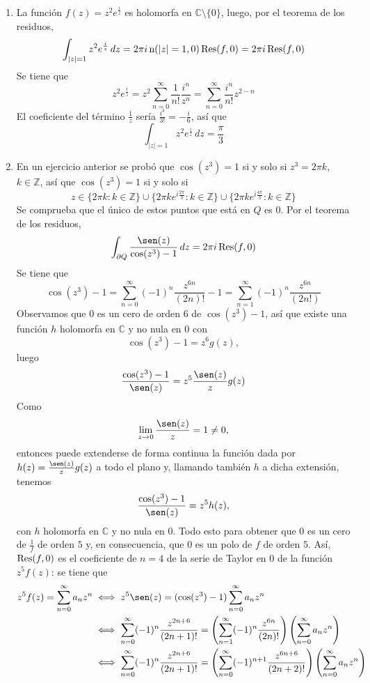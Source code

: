 \documentclass[11pt]{report}
\makeatletter
\renewenvironment{proof}[1][\proofname]{\par
  \pushQED{\qed}%
  \normalfont \topsep\z@skip %
  \trivlist
  \item[\hskip\labelsep
        \itshape
    #1\@addpunct{.}]\ignorespaces
}{%
  \popQED\endtrivlist\@endpefalse
}
\newcommand{\Z}{\mathbb Z}
\newcommand{\C}{\mathbb C}
\makeatother
\begin{document}
\begin{proof}
  \hfill
  \begin{enumerate}
    \item La función $f(z)=z^2e^{\frac{i}{z}}$ es holomorfa en $\C \setminus \{0\}$, luego, por el teorema de los residuos,
    \[\int_{|z|=1}z^2e^{\frac{i}{z}} \, dz = 2\pi i \, \textup{n}(|z|=1, 0) \, \textup{Res}(f,0) = 2\pi i \, \textup{Res}(f,0)\]
    Se tiene que
    \[z^2e^{\frac{i}{z}} = z^2\sum_{n=0}^\infty \frac{1}{n!}\frac{i^n}{z^n} = \sum_{n=0}^\infty \frac{i^n}{n!}z^{2-n}\]
    El coeficiente del término $\frac{1}{z}$ sería $\frac{i^3}{3!} = -\frac{i}{6}$, así que
    \[\int_{|z|=1}z^2e^{\frac{i}{z}} \, dz = \frac{\pi}{3}\]
    \item En un ejercicio anterior se probó que $\cos(z^3) = 1$ si y solo si $z^3 = 2\pi k$, $k \in \Z$, así que $\cos(z^3) = 1$ si y solo si
    \[z \in \{2\pi k \colon k \in \Z\} \cup \{2\pi k e^{i\frac{2\pi}{3}} \colon k \in \Z\} \cup \{2\pi k e^{i\frac{4\pi}{3}} \colon k \in \Z\}\]
    Se comprueba que el único de estos puntos que está en $Q$ es $0$. Por el teorema de los residuos,
    \[\int_{\partial Q}\frac{\sen(z)}{\cos(z^3)-1} \, dz = 2\pi i \, \textup{Res}(f,0)\]
    Se tiene que
    \[\cos(z^3)-1 = \sum_{n=0}^\infty(-1)^n\frac{z^{6n}}{(2n)!}-1 = \sum_{n=1}^\infty(-1)^n\frac{z^{6n}}{(2n!)} \]
    Observamos que $0$ es un cero de orden $6$ de $\cos(z^3)-1$, así que existe una función $h$ holomorfa en $\C$ y no nula en $0$ con
    \[\cos(z^3)-1 = z^6g(z),\]
    luego
    \[\frac{\cos(z^3)-1}{\sen(z)} = z^5\frac{\sen(z)}{z}g(z)\]
    Como
    \[\lim_{z \to 0} \frac{\sen(z)}{z} = 1 \neq 0,\]
    entonces puede extenderse de forma continua la función dada por $h(z)=\frac{\sen(z)}{z}g(z)$ a todo el plano y, llamando también $h$ a dicha extensión, tenemos
    \[\frac{\cos(z^3)-1}{\sen(z)} = z^5h(z),\]
    con $h$ holomorfa en $\C$ y no nula en $0$. Todo esto para obtener que $0$ es un cero de $\frac{1}{f}$ de orden $5$ y, en consecuencia, que $0$ es un polo de $f$ de orden $5$. Así, $\textup{Res}(f,0)$ es el coeficiente de $n=4$ de la serie de Taylor en $0$ de la función $z^5f(z)$: se tiene que
    \[\begin{aligned}[t]
      z^5f(z)=\sum_{n=0}^\infty a_nz^n &\iff z^5\sen(z)=(\cos(z^3)-1)\sum_{n=0}^\infty a_nz^n \\
      &\iff \sum_{n=0}^\infty (-1)^n\frac{z^{2n+6}}{(2n+1)!} = \left(\sum_{n=1}^\infty(-1)^n \frac{z^{6n}}{(2n)!}\right)\left(\sum_{n=0}^\infty a_nz^n\right) \\
      &\iff \sum_{n=0}^\infty (-1)^n\frac{z^{2n+6}}{(2n+1)!} = \left(\sum_{n=0}^\infty(-1)^{n+1} \frac{z^{6n+6}}{(2n+2)!}\right)\left(\sum_{n=0}^\infty a_nz^n\right) \\

\end{aligned}\]
\end{enumerate}
\end{proof}
\end{document}
